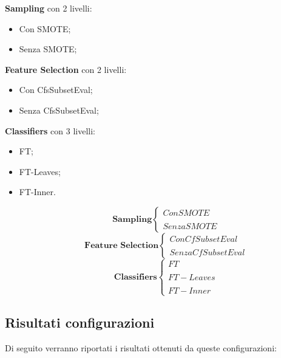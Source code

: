 \textbf{Sampling} con 2 livelli:
\begin{itemize}
	\item Con SMOTE;
	\item Senza SMOTE;
\end{itemize}

\textbf{Feature Selection} con 2 livelli:
\begin{itemize}
	\item Con CfsSubsetEval;
	\item Senza CfsSubsetEval;
\end{itemize}

\textbf{Classifiers} con 3 livelli:
\begin{itemize}
	\item FT;
	\item FT-Leaves;
	\item FT-Inner.
\end{itemize}


			\begin{equation*}
			\qquad \textbf{Sampling}
			\begin{cases} 
				Con SMOTE \\~\\ Senza SMOTE 
			\end{cases}
			\end{equation*}
			\begin{equation*}
			\qquad \textbf{Feature Selection}
			\begin{cases} 
				Con CfSubsetEval \\~\\ Senza CfSubsetEval
			\end{cases}
			\end{equation*}
			\begin{equation*}
			\qquad \textbf{Classifiers}
			\begin{cases} 
			FT \\~\\ FT-Leaves \\~\\ FT-Inner
			\end{cases}
			\end{equation*}

\subsection{Risultati configurazioni}
Di seguito verranno riportati i risultati ottenuti da queste configurazioni: 


